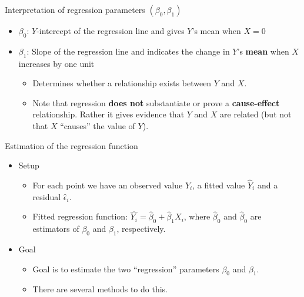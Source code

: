 \documentclass{article}
\begin{document}
Interpretation of regression parameters $(\beta_0, \beta_1)$\bigskip
\begin{itemize}
    \item $\beta_0$: $Y$-intercept of the regression line and gives $Y$'s mean when $X = 0$\vspace{20pt}
    \item $\beta_1$: Slope of the regression line and indicates the change in $Y$'s \textbf{mean} when $X$ increases by one unit \vspace{20pt}
    \begin{itemize}
        \item Determines whether a relationship exists between $Y$ and $X$.
        \item Note that regression \textbf{does not} substantiate or prove a \textbf{cause-effect} relationship. Rather it gives evidence that $Y$ and $X$ are related (but not that $X$ ``causes'' the value of $Y$).
    \end{itemize}
\end{itemize}\bigskip

Estimation of the regression function\bigskip
\begin{itemize}
    \item Setup
    \begin{itemize}
        \item For each point we have an observed value $Y_i$, a fitted value $\hat{Y}_i$ and a residual $\hat{\epsilon}_i$.
        \item Fitted regression function: $\hat{Y_i} = \hat{\beta}_0 + \hat{\beta}_1 X_i$, where $\hat{\beta}_0$ and $\hat{\beta}_0$ are estimators of $\beta_0$ and $\beta_1$, respectively.
    \end{itemize}
    \item Goal
    \begin{itemize}
        \item Goal is to estimate the two ``regression'' parameters $\beta_0$ and $\beta_1$.
        \item There are several methods to do this.
     \end{itemize}
\end{itemize}\bigskip
\end{document}
